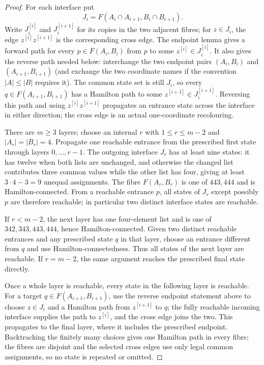 \documentclass[11pt]{article}
\theoremstyle{remark}
\numberwithin{equation}{section}
\numberwithin{table}{section}
\begin{document}
\begin{proof}
For each interface put
\[
 J_i=F(A_i\cap A_{i+1},B_i\cap B_{i+1}).
\]
Write $J_i^{[i]}$ and $J_i^{[i+1]}$ for its copies in the two adjacent
fibres; for $z\in J_i$, the edge
$z^{[i]}z^{[i+1]}$ is the corresponding cross edge.  The endpoint
lemma gives a forward path for every $p\in F(A_i,B_i)$ from $p$ to
some $z^{[i]}\in J_i^{[i]}$.  It also gives the reverse path needed
below: interchange the two endpoint pairs
$(A_i,B_i)$ and $(A_{i+1},B_{i+1})$ (and exchange the two coordinate
names if the convention $|A|\le|B|$ requires it).  The common state set
is still $J_i$, so every $q\in F(A_{i+1},B_{i+1})$ has a Hamilton path
to some $z^{[i+1]}\in J_i^{[i+1]}$.  Reversing this path and using
$z^{[i]}z^{[i+1]}$ propagates an entrance state across the interface in
either direction; the cross edge is an actual one-coordinate
recolouring.

There are $m\ge3$ layers; choose an internal $r$ with
$1\le r\le m-2$ and $|A_r|=|B_r|=4$.  Propagate one reachable entrance
from the prescribed first state through layers $0,\ldots,r-1$.  The
outgoing interface $J_r$ has at least nine states: it has twelve when
both lists are unchanged, and otherwise the changed list contributes
three common values while the other list has four, giving at least
$3\cdot4-3=9$ unequal assignments.  The fibre $F(A_r,B_r)$ is one of
$443,444$ and is Hamilton-connected.  From a reachable entrance $p$,
all states of $J_r$ except possibly $p$ are therefore reachable; in
particular two distinct interface states are reachable.

If $r<m-2$, the next layer has one four-element list and is one of
$342,343,443,444$, hence Hamilton-connected.  Given two distinct
reachable entrances and any prescribed state $q$ in that layer, choose
an entrance different from $q$ and use Hamilton-connectedness.  Thus
all states of the next layer are reachable.  If $r=m-2$, the same
argument reaches the prescribed final state directly.

Once a whole layer is reachable, every state in the following layer is
reachable.  For a target $q\in F(A_{i+1},B_{i+1})$, use the reverse
endpoint statement above to choose $z\in J_i$ and a Hamilton path from
$z^{[i+1]}$ to $q$; the fully reachable incoming interface supplies the
path to $z^{[i]}$, and the cross edge joins the two.  This propagates to
the final layer, where it includes the prescribed endpoint.
Backtracking the finitely many choices gives one Hamilton path in every
fibre; the fibres are disjoint and the selected cross edges use only
legal common assignments, so no state is repeated or omitted.
\end{proof}
\end{document}
